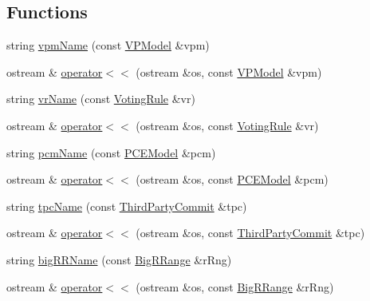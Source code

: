 \subsection*{Functions}
\begin{DoxyCompactItemize}
\item 
string \hyperlink{namespace_k_base_a0c8eba6be396a754f747b5778ed98a28}{vpm\-Name} (const \hyperlink{namespace_k_base_a7dac0bfa8a690bf0b88dc620a7ac2d71}{V\-P\-Model} \&vpm)
\item 
ostream \& \hyperlink{namespace_k_base_a08fabe46c3b55eabe44b44fa86afeadc}{operator$<$$<$} (ostream \&os, const \hyperlink{namespace_k_base_a7dac0bfa8a690bf0b88dc620a7ac2d71}{V\-P\-Model} \&vpm)
\item 
string \hyperlink{namespace_k_base_a06f9f2afead202780f5f09826b6c2de8}{vr\-Name} (const \hyperlink{namespace_k_base_a6430bae9b90b42e1301bb4eee587bbf3}{Voting\-Rule} \&vr)
\item 
ostream \& \hyperlink{namespace_k_base_af59dc55c9762a3446701309d6b6716ba}{operator$<$$<$} (ostream \&os, const \hyperlink{namespace_k_base_a6430bae9b90b42e1301bb4eee587bbf3}{Voting\-Rule} \&vr)
\item 
string \hyperlink{namespace_k_base_a93f654671ca9491f43fdbf279a8dfae1}{pcm\-Name} (const \hyperlink{namespace_k_base_a498a929a17ac96ff70afee8eb4e17cd0}{P\-C\-E\-Model} \&pcm)
\item 
ostream \& \hyperlink{namespace_k_base_a8a51fa62609f14a7d4925b90555d66ac}{operator$<$$<$} (ostream \&os, const \hyperlink{namespace_k_base_a498a929a17ac96ff70afee8eb4e17cd0}{P\-C\-E\-Model} \&pcm)
\item 
string \hyperlink{namespace_k_base_a21e183ec07b0c63a5a93b59056c76c44}{tpc\-Name} (const \hyperlink{namespace_k_base_aca1021042b887fdf10cc3d6b0f9cef06}{Third\-Party\-Commit} \&tpc)
\item 
ostream \& \hyperlink{namespace_k_base_ac7e7fd7c25cdf6c213df3cc7e2a36cd6}{operator$<$$<$} (ostream \&os, const \hyperlink{namespace_k_base_aca1021042b887fdf10cc3d6b0f9cef06}{Third\-Party\-Commit} \&tpc)
\item 
string \hyperlink{namespace_k_base_a9a94fd7f98b5622120584fcb870fcf4c}{big\-R\-R\-Name} (const \hyperlink{namespace_k_base_ad1033118c8842a9ee6ff4d01651a2640}{Big\-R\-Range} \&r\-Rng)
\item 
ostream \& \hyperlink{namespace_k_base_a3fe2153236311782e7608a72bbe06af6}{operator$<$$<$} (ostream \&os, const \hyperlink{namespace_k_base_ad1033118c8842a9ee6ff4d01651a2640}{Big\-R\-Range} \&r\-Rng)
\item 

\end{DoxyCompactItemize}
